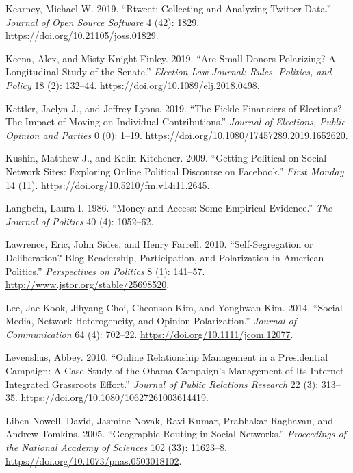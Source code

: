 \documentclass[12pt,]{article}
\begin{document}
\leavevmode\hypertarget{ref-rtweet}{}%
Kearney, Michael W. 2019. ``Rtweet: Collecting and Analyzing Twitter
Data.'' \emph{Journal of Open Source Software} 4 (42): 1829.
\url{https://doi.org/10.21105/joss.01829}.

\leavevmode\hypertarget{ref-keena2019}{}%
Keena, Alex, and Misty Knight-Finley. 2019. ``Are Small Donors
Polarizing? A Longitudinal Study of the Senate.'' \emph{Election Law
Journal: Rules, Politics, and Policy} 18 (2): 132--44.
\url{https://doi.org/10.1089/elj.2018.0498}.

\leavevmode\hypertarget{ref-kettler2019}{}%
Kettler, Jaclyn J., and Jeffrey Lyons. 2019. ``The Fickle Financiers of
Elections? The Impact of Moving on Individual Contributions.''
\emph{Journal of Elections, Public Opinion and Parties} 0 (0): 1--19.
\url{https://doi.org/10.1080/17457289.2019.1652620}.

\leavevmode\hypertarget{ref-kushin2009}{}%
Kushin, Matthew J., and Kelin Kitchener. 2009. ``Getting Political on
Social Network Sites: Exploring Online Political Discourse on
Facebook.'' \emph{First Monday} 14 (11).
\url{https://doi.org/10.5210/fm.v14i11.2645}.

\leavevmode\hypertarget{ref-langbein1986}{}%
Langbein, Laura I. 1986. ``Money and Access: Some Empirical Evidence.''
\emph{The Journal of Politics} 40 (4): 1052--62.

\leavevmode\hypertarget{ref-lawrence2010}{}%
Lawrence, Eric, John Sides, and Henry Farrell. 2010. ``Self-Segregation
or Deliberation? Blog Readership, Participation, and Polarization in
American Politics.'' \emph{Perspectives on Politics} 8 (1): 141--57.
\url{http://www.jstor.org/stable/25698520}.

\leavevmode\hypertarget{ref-lee2014}{}%
Lee, Jae Kook, Jihyang Choi, Cheonsoo Kim, and Yonghwan Kim. 2014.
``Social Media, Network Heterogeneity, and Opinion Polarization.''
\emph{Journal of Communication} 64 (4): 702--22.
\url{https://doi.org/10.1111/jcom.12077}.

\leavevmode\hypertarget{ref-levenshus2010}{}%
Levenshus, Abbey. 2010. ``Online Relationship Management in a
Presidential Campaign: A Case Study of the Obama Campaign's Management
of Its Internet-Integrated Grassroots Effort.'' \emph{Journal of Public
Relations Research} 22 (3): 313--35.
\url{https://doi.org/10.1080/10627261003614419}.

\leavevmode\hypertarget{ref-liben2005}{}%
Liben-Nowell, David, Jasmine Novak, Ravi Kumar, Prabhakar Raghavan, and
Andrew Tomkins. 2005. ``Geographic Routing in Social Networks.''
\emph{Proceedings of the National Academy of Sciences} 102 (33):
11623--8. \url{https://doi.org/10.1073/pnas.0503018102}.
\end{document}
